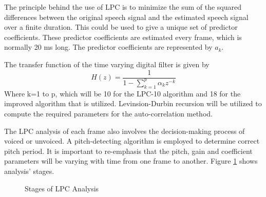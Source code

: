 \documentclass[12pt, a4paper, twoside]{report}
\begin{document}
The principle behind the use of LPC is to minimize the sum of the squared differences between the original speech signal and the estimated speech signal over a finite duration. This could be used to give a unique set of predictor coefficients. These predictor coefficients are estimated every frame, which is normally 20 ms long. The predictor coefficients are represented by $a_k$.

The transfer function of the time varying
digital filter is given by
\begin{equation}
H(z) = \frac{1}{1-\sum_{k=1}^{p} \alpha_k z^{-k}}
\end{equation}
Where k=1 to p, which will be 10 for the LPC-10 algorithm and 18 for the improved algorithm that is utilized. Levinsion-Durbin recursion will be utilized to compute the required parameters for the auto-correlation method. 

The LPC analysis of each frame also involves the decision-making process of voiced or unvoiced. A pitch-detecting algorithm is employed to determine correct pitch period. It is
important to re-emphasis that the pitch, gain and coefficient parameters will be varying with time from one frame to another. Figure \ref{fig:lpc_analysis_stages} shows analysis' stages.

\begin{figure}[h!]
\centering
{}
\caption{Stages of LPC Analysis}
\label{fig:lpc_analysis_stages}
\end{figure}
\end{document}
